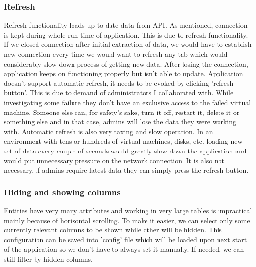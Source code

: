 \subsubsection{Refresh}
Refresh functionality loads up to date data from API. As mentioned, connection is kept during whole run time of application. This is due to refresh functionality. If we closed connection after initial extraction of data, we would have to establish new connection every time we would want to refresh any tab which would considerably slow down process of getting new data. After losing the connection, application keeps on functioning properly but isn't able to update. Application doesn't support automatic refresh, it needs to be evoked by clicking 'refresh button'. This is due to demand of administrators I collaborated with. While investigating some failure they don't have an exclusive access to the failed virtual machine. Someone else can, for safety's sake, turn it off, restart it, delete it or something else and in that case, admins will lose the data they were working with. Automatic refresh is also very taxing and slow operation. In an environment with tens or hundreds of virtual machines, disks, etc. loading new set of data every couple of seconds would greatly slow down the application and would put unnecessary pressure on the network connection. It is also not necessary, if admins require latest data they can simply press the refresh button.

\subsubsection{Hiding and showing columns}
Entities have very many attributes and working in very large tables is impractical mainly because of horizontal scrolling. To make it easier, we can select only some currently relevant columns to be shown while other will be hidden. This configuration can be saved into 'config' file which will be loaded upon next start of the application so we don't have to always set it manually. If needed, we can still filter by hidden columns.

